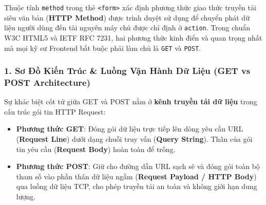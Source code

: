 \documentclass[11pt,oneside]{book}
\newcommand{\codeinline}[1]{\textcolor{accentOrange}{\texttt{#1}}}
\newcommand{\term}[1]{\textbf{\textcolor{primaryBlue}{#1}}}
\begin{document}
Thuộc tính \codeinline{method} trong thẻ \codeinline{<form>} xác định phương thức giao thức truyền tải siêu văn bản (\term{HTTP Method}) được trình duyệt sử dụng để chuyển phát dữ liệu người dùng đến tài nguyên máy chủ được chỉ định ở \codeinline{action}. Trong chuẩn W3C HTML5 và IETF RFC 7231, hai phương thức kinh điển và quan trọng nhất mà mọi kỹ sư Frontend bắt buộc phải làm chủ là \codeinline{GET} và \codeinline{POST}.

\subsubsection{1. Sơ Đồ Kiến Trúc \& Luồng Vận Hành Dữ Liệu (GET vs POST Architecture)}

\begin{conceptBox}
Sự khác biệt cốt tử giữa GET và POST nằm ở \textbf{kênh truyền tải dữ liệu} trong cấu trúc gói tin HTTP Request:
\begin{itemize}[leftmargin=1.5em, itemsep=3pt, parsep=0pt]
    \item \textbf{Phương thức GET}: Đóng gói dữ liệu trực tiếp lên dòng yêu cầu URL (\term{Request Line}) dưới dạng chuỗi truy vấn (\term{Query String}). Thân của gói tin yêu cầu (\term{Request Body}) hoàn toàn để trống.
    \item \textbf{Phương thức POST}: Giữ cho đường dẫn URL sạch sẽ và đóng gói toàn bộ tham số vào phần thân dữ liệu ngầm (\term{Request Payload / HTTP Body}) qua luồng dữ liệu TCP, cho phép truyền tải an toàn và không giới hạn dung lượng.
\end{itemize}
\end{conceptBox}
\end{document}
